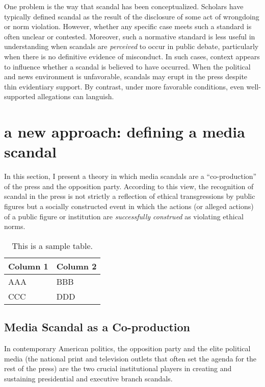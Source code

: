 \documentclass{cupjournal}
\begin{document}
One problem is the way that scandal has been conceptualized. Scholars have typically defined scandal as the result of the disclosure of some act of wrongdoing or norm violation. However, whether any specific case meets such a standard is often unclear or contested. Moreover, such a normative standard is less useful in understanding when scandals are \emph{perceived} to occur in public debate, particularly when there is no definitive evidence of misconduct. In such cases, context appears to influence whether a scandal is believed to have occurred. When the political and news environment is unfavorable, scandals may erupt in the press despite thin evidentiary support. By contrast, under more favorable conditions, even well-supported allegations can languish.


\section{a new approach: defining a media scandal}

In this section, I present a theory in which media scandals are a
``co-production'' of the press and the opposition party. According to
this view, the recognition of scandal in the press is not strictly a
reflection of ethical transgressions by public figures but a socially
constructed event in which the actions (or alleged actions) of a public
figure or institution are \emph{successfully construed} as violating
ethical norms.

\begin{table}
\centering
\caption{This is a sample table.}
\begin{tabular}{ll}
\hline\hline
Column 1 & Column 2\\
\hline
AAA & BBB\\
CCC & DDD\\
\hline\hline
\end{tabular}

\end{table}

\subsection{Media Scandal as a Co-production}

In contemporary American politics, the opposition party and the elite
political media (the national print and television outlets that often
set the agenda for the rest of the press) are the two crucial
institutional players in creating and sustaining presidential and
executive branch scandals.
\end{document}
